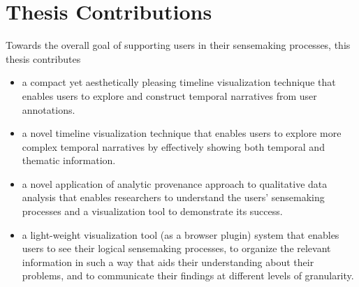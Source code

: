 \section{Thesis Contributions}
%
%
%
%
%
%

Towards the overall goal of supporting users in their sensemaking processes, this thesis contributes
\begin{itemize}
	\item a compact yet aesthetically pleasing timeline visualization technique that enables users to explore and construct temporal narratives from user annotations.
	\item a novel timeline visualization technique that enables users to explore more complex temporal narratives by effectively showing both temporal and thematic information. %
	\item a novel application of analytic provenance approach to qualitative data analysis that enables researchers to understand the users' sensemaking processes and a visualization tool to demonstrate its success.%
	\item a light-weight visualization tool (as a browser plugin) system that enables users to see their logical sensemaking processes, to organize the relevant information in such a way that aids their understanding about their problems, and to communicate their findings at different levels of granularity.
\end{itemize}

